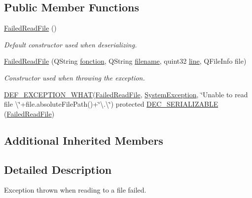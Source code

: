 \subsection*{Public Member Functions}
\begin{DoxyCompactItemize}
\item 
\hyperlink{class_gost_crypt_1_1_failed_read_file_abed958466f74017ca79332ea9879c893}{Failed\+Read\+File} ()
\begin{DoxyCompactList}\small\item\em Default constructor used when deserializing. \end{DoxyCompactList}\item 
\hyperlink{class_gost_crypt_1_1_failed_read_file_a1b7632eacd92648507d6797e56067886}{Failed\+Read\+File} (Q\+String \hyperlink{class_gost_crypt_1_1_gost_crypt_exception_a29b8c93d5efbb1ff369107385725a939}{fonction}, Q\+String \hyperlink{class_gost_crypt_1_1_gost_crypt_exception_a749a12375f4ba9d502623b99d8252f38}{filename}, quint32 \hyperlink{class_gost_crypt_1_1_gost_crypt_exception_abf506d911f12a4e969eea500f90bd32c}{line}, Q\+File\+Info file)
\begin{DoxyCompactList}\small\item\em Constructor used when throwing the exception. \end{DoxyCompactList}\item 
\hyperlink{_gost_crypt_exception_8h_a5bc1e1c6c9d6f46c84eeba49e33355f9}{D\+E\+F\+\_\+\+E\+X\+C\+E\+P\+T\+I\+O\+N\+\_\+\+W\+H\+AT}(\hyperlink{class_gost_crypt_1_1_failed_read_file}{Failed\+Read\+File}, \hyperlink{class_gost_crypt_1_1_system_exception}{System\+Exception}, \char`\"{}Unable to read file \textbackslash{}\char`\"{}+file.\+absolute\+File\+Path()+\char`\"{}\textbackslash{}.\textbackslash{}\char`\"{}) protected \hyperlink{class_gost_crypt_1_1_failed_read_file_aecb8597dda1693648540550217f0f28f}{D\+E\+C\+\_\+\+S\+E\+R\+I\+A\+L\+I\+Z\+A\+B\+LE} (\hyperlink{class_gost_crypt_1_1_failed_read_file}{Failed\+Read\+File})
\end{DoxyCompactItemize}
\subsection*{Additional Inherited Members}


\subsection{Detailed Description}
Exception thrown when reading to a file failed. 

